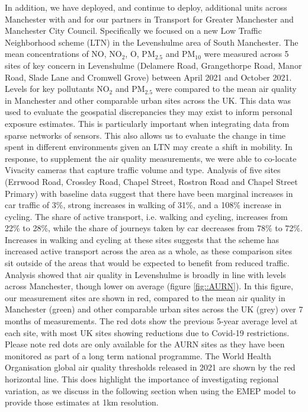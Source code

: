 \documentclass{article}
\begin{document}
\noindent In addition, we have deployed, and continue to deploy, additional units across Manchester with and for our partners in Transport for Greater Manchester and Manchester City Council. Specifically we focused on a new Low Traffic Neighborhood scheme (LTN) in the Levenshulme area of South Manchester. The mean concentrations of NO, NO$_{2}$, O, PM$_{2.5}$ and PM$_{10}$ were measured across 5 sites of key concern in Levenshulme (Delamere Road, Grangethorpe Road, Manor Road, Slade Lane and Cromwell Grove) between April 2021 and October 2021. Levels for key pollutants NO$_{2}$  and PM$_{2.5}$ were compared to the mean air quality in Manchester and other comparable urban sites across the UK. This data was used to evaluate the geospatial discrepancies they may exist to inform personal exposure estimates. This is particularly important when integrating data from sparse networks of sensors. This also allows us to evaluate the change in time spent in different environments given an LTN may create a shift in mobility. In response, to supplement the air quality measurements, we were able to co-locate Vivacity cameras  that capture traffic volume and type. Analysis of five sites (Errwood Road, Crossley Road, Chapel Street, Rostron Road and Chapel Street Primary) with baseline data suggest that there have been marginal increases in car traffic of 3\%, strong increases in walking of 31\%, and a 108\% increase in cycling. The share of active transport, i.e. walking and cycling, increases from 22\% to 28\%, while the share of journeys taken by car decreases from 78\% to 72\%. Increases in walking and cycling at these sites suggests that the scheme has increased active transport across the area as a whole, as these comparison sites sit outside of the areas that would be expected to benefit from reduced traffic.  \\

\noindent Analysis showed that air quality in Levenshulme is broadly in line with levels across Manchester, though lower on average (figure \ref{fig::AURN}). In this figure, our measurement sites are shown in red, compared to the mean air quality in Manchester (green) and other comparable urban sites across the UK (grey) over 7 months of measurements. The red dots show the previous 5-year average level at each site, with most UK sites showing reductions due to Covid-19 restrictions. Please note red dots are only available for the AURN sites as they have been monitored as part of a long term national programme. The World Health Organisation global air quality thresholds released in 2021 are shown by the red horizontal line.  This does highlight the importance of investigating regional variation, as we discuss in the following section when using the EMEP model to provide those estimates at 1km resolution. \\
\end{document}
